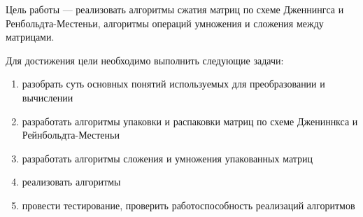 Цель работы --- реализовать алгоритмы сжатия матриц по схеме Дженнингса и Ренбольдта-Местеньи, алгоритмы операций умножения и сложения между матрицами.

Для достижения цели необходимо выполнить следующие задачи:
\begin{enumerate}
\item разобрать суть основных понятий используемых для преобразовании и вычислении
\item разработать алгоритмы упаковки и распаковки матриц по схеме Джениннкса и Рейнбольдта-Местеньи
\item разработать алгоритмы сложения и умножения упакованных матриц
\item реализовать алгоритмы 
\item провести тестирование, проверить работоспособность реализаций алгоритмов 
\end{enumerate}
\clearpage
